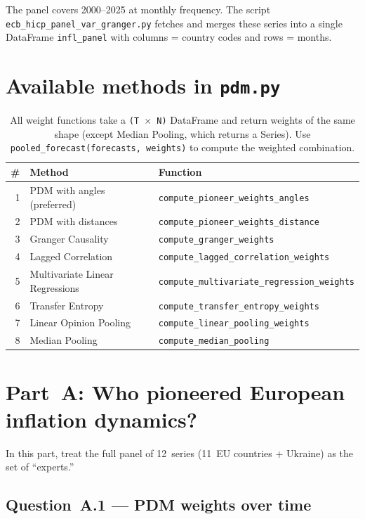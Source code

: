 \documentclass[11pt,a4paper]{article}
\begin{document}
\noindent The panel covers 2000--2025 at monthly frequency. The script \texttt{ecb\_hicp\_panel\_var\_granger.py} fetches and merges these series into a single DataFrame \texttt{infl\_panel} with columns = country codes and rows = months.

\section*{Available methods in \texttt{pdm.py}}

\begin{table}[h]
\centering
\small
\begin{tabular}{@{}rll@{}}
\toprule
\# & Method & Function \\
\midrule
1 & PDM with angles (preferred) & \texttt{compute\_pioneer\_weights\_angles} \\
2 & PDM with distances & \texttt{compute\_pioneer\_weights\_distance} \\
3 & Granger Causality & \texttt{compute\_granger\_weights} \\
4 & Lagged Correlation & \texttt{compute\_lagged\_correlation\_weights} \\
5 & Multivariate Linear Regressions & \texttt{compute\_multivariate\_regression\_weights} \\
6 & Transfer Entropy & \texttt{compute\_transfer\_entropy\_weights} \\
7 & Linear Opinion Pooling & \texttt{compute\_linear\_pooling\_weights} \\
8 & Median Pooling & \texttt{compute\_median\_pooling} \\
\bottomrule
\end{tabular}
\caption*{All weight functions take a \texttt{(T $\times$ N)} DataFrame and return weights of the same shape (except Median Pooling, which returns a Series). Use \texttt{pooled\_forecast(forecasts, weights)} to compute the weighted combination.}
\end{table}


\section{Part~A: Who pioneered European inflation dynamics?}

\noindent In this part, treat the full panel of 12~series (11~EU countries + Ukraine) as the set of ``experts.''

\subsection*{Question~A.1 --- PDM weights over time}
\end{document}
